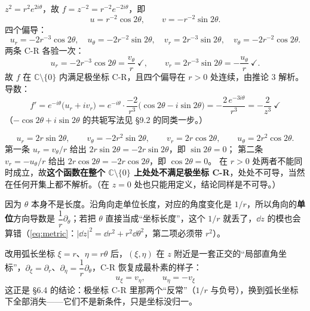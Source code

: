 \documentclass[11pt]{ctexart}
\newcommand{\chk}{\ensuremath{\checkmark}}
\let\origsubhdr\subhdr
\renewcommand{\subhdr}[1]{\par\needspace{4\baselineskip}\origsubhdr{#1}}
\begin{document}


$z^2=r^2e^{2i\theta}$，故 $f=z^{-2}=r^{-2}e^{-2i\theta}$，即
\[ u=r^{-2}\cos2\theta,\qquad v=-r^{-2}\sin2\theta . \]
四个偏导：
\[ u_r=-2r^{-3}\cos2\theta,\quad u_\theta=-2r^{-2}\sin2\theta,\quad
v_r=2r^{-3}\sin2\theta,\quad v_\theta=-2r^{-2}\cos2\theta . \]
两条 C-R 各验一次：
\[ u_r=-2r^{-3}\cos2\theta=\frac{v_\theta}{r}\ \chk,\qquad
v_r=2r^{-3}\sin2\theta=-\frac{u_\theta}{r}\ \chk . \]
故 $f$ 在 $\mathbb{C}\setminus\{0\}$ 内满足极坐标 C-R，且四个偏导在 $r>0$ 处连续，由推论 3 解析。导数：
\[ f'=e^{-i\theta}\bigl(u_r+iv_r\bigr)=e^{-i\theta}\cdot\frac{-2}{r^{3}}\bigl(\cos2\theta-i\sin2\theta\bigr)
=-\frac{2\,e^{-3i\theta}}{r^{3}}=-\frac{2}{z^{3}}\ \chk \]
（$-\cos2\theta+i\sin2\theta$ 的共轭写法见 §9.2 的同类一步。）



\[ u_r=2r\sin2\theta,\qquad v_\theta=-2r^2\sin2\theta,\qquad
v_r=2r\cos2\theta,\qquad u_\theta=2r^2\cos2\theta . \]
第一条 $u_r=v_\theta/r$ 给出 $2r\sin2\theta=-2r\sin2\theta$，即 $\sin2\theta=0$；
第二条 $v_r=-u_\theta/r$ 给出 $2r\cos2\theta=-2r\cos2\theta$，即 $\cos2\theta=0$。
在 $r>0$ 处两者不能同时成立，故\textbf{这个函数在整个 $\mathbb{C}\setminus\{0\}$ 上处处不满足极坐标 C-R}，处处不可导，当然在任何开集上都不解析。（在 $z=0$ 处也只能用定义，结论同样是不可导。）



因为 $\theta$ 本身不是长度。沿角向走单位长度，对应的角度变化是 $1/r$，所以角向的\textbf{单位}方向导数是 $\dfrac1r\partial_\theta$；若把 $\theta$ 直接当成“坐标长度”，这个 $1/r$ 就丢了，$\dd z$ 的模也会算错（\eqref{eq:metric}：$|\dd z|^2=\dd r^2+r^2\dd\theta^2$，第二项必须带 $r^2$）。

改用弧长坐标 $\xi=r$、$\eta=r\theta$ 后，$(\xi,\eta)$ 在 $z$ 附近是一套正交的“局部直角坐标”，$\partial_\xi=\partial_r$、$\partial_\eta=\dfrac1r\partial_\theta$，C-R 恢复成最朴素的样子：
\[ \boxed{\;u_\xi=v_\eta,\qquad u_\eta=-v_\xi\;} \]
这正是 §6.4 的结论：极坐标 C-R 里那两个“反常”（$1/r$ 与负号），换到弧长坐标下全部消失——它们不是新条件，只是坐标没归一。
\end{document}
